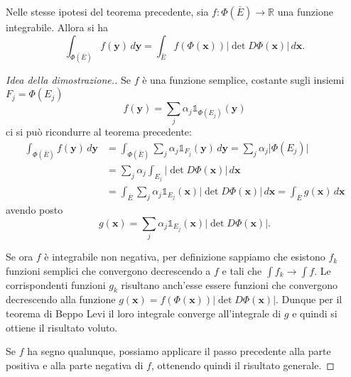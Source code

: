 \documentclass[italian,a4paper]{scrartcl}
\newcommand{\RR}{{\mathbb R}}
\renewcommand{\vec}{\mathbf}
\begin{document}
\begin{theorem}
Nelle stesse ipotesi del teorema precedente, sia $f\colon \Phi(\bar E) \to
\RR$ una funzione integrabile. Allora si ha
\[
\int_{\Phi(\bar E)} f(\vec y) \, d\vec y 
=\int_{\bar E} f(\Phi(\vec x)) \lvert \det D\Phi(\vec x)\rvert\,
d\vec x.
\]
\end{theorem}

\begin{proof}[Idea della dimostrazione.]
Se $f$ è una funzione semplice, costante sugli insiemi $F_j=\Phi(E_j)$
\[
  f(\vec y) = \sum_j \alpha_j \mathbb 1_{\Phi(E_j)}(\vec y)
\]
ci si può ricondurre al teorema precedente:
\begin{align*}
  \int_{\Phi(\bar E)} f(\vec y) \, d\vec y
  &= \int_{\Phi(\bar E)} \sum_j \alpha_j \mathbb 1_{F_j}(\vec y)\, d\vec y
  = \sum_j \alpha_j \lvert\Phi(E_j)\rvert  \\
  &= \sum_j \alpha_j \int_{E_j} \lvert \det D\Phi(\vec x)\rvert\,
  d\vec x\\
  &= \int_{\bar E} \sum_j \alpha_j \mathbb 1_{E_j}(\vec x)\lvert\det D\Phi(\vec x)\rvert\,
  d\vec x
  = \int_{\bar E} g(\vec x)\, d\vec x
\end{align*}
avendo posto
\[
  g(\vec x) = \sum_j \alpha_j \mathbb 1_{E_j}(\vec x)\lvert\det D\Phi(\vec x)\rvert.
\]

Se ora $f$ è integrabile non negativa, per definizione sappiamo che esistono $f_k$
funzioni semplici che convergono decrescendo a $f$ e tali che
$\int f_k \to \int f$. Le corrispondenti funzioni $g_k$ risultano
anch'esse essere funzioni che convergono decrescendo alla funzione
$g(\vec x) = f(\Phi(\vec x))\lvert \det D\Phi(\vec
x)\rvert$. Dunque per il teorema di Beppo Levi il loro integrale
converge all'integrale di $g$ e quindi si ottiene il risultato voluto.

Se $f$ ha segno qualunque, possiamo applicare il passo precedente alla
parte positiva e alla parte negativa di $f$, ottenendo quindi il
risultato generale.
\end{proof}
\end{document}

